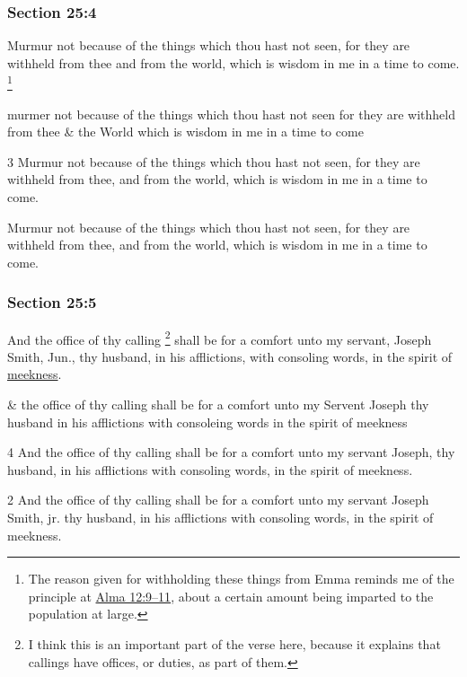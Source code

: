 	\subsubsection{Section 25:4} %
		\label{DC25-4}

		Murmur not because of the things which thou hast not seen, for they are withheld from thee and from the world, which is wisdom in me in a time to come.%
			\footnote{%
				The reason given for withholding these things from Emma reminds me of the principle at \hyperref[ALMA-12-9]{Alma 12:9--11}, about a certain amount being imparted to the population at large.
				}

		\begin{framed}
		\scriptsize
			\begin{compactdesc}
				\item[JSP] murmer not because of the things which thou hast not seen for they are withheld from thee \& the World which is wisdom in me in a time to come
				\item[BC] 3 Murmur not because of the things which thou hast not seen, for they are withheld from thee, and from the world, which is wisdom in me in a time to come.
				\item[DC 1835] Murmur not because of the things which thou hast not seen, for they are withheld from thee, and from the world, which is wisdom in me in a time to come.
			\end{compactdesc}
		\end{framed}

	\subsubsection{Section 25:5} %
		\label{DC25-5}

		And the office of thy calling%
			\footnote{%
				I think this is an important part of the verse here, because it explains that callings have offices, or duties, as part of them.
				} 
		shall be for a comfort unto my servant, Joseph Smith, Jun., thy husband, in his afflictions, with consoling words, in the spirit of \hyperref[MEEKNESS]{meekness}.

		\begin{framed}
		\scriptsize
			\begin{compactdesc}
				\item[JSP] \& the office of thy calling shall be for a comfort unto my Servent Joseph thy husband in his afflictions with consoleing words in the spirit of meekness
				\item[BC] 4 And the office of thy calling shall be for a comfort unto my servant Joseph, thy husband, in his afflictions with consoling words, in the spirit of meekness. 
				\item[DC 1835] 2 And the office of thy calling shall be for a comfort unto my servant Joseph Smith, jr. thy husband, in his afflictions with consoling words, in the spirit of meekness.
			\end{compactdesc}
		\end{framed}

